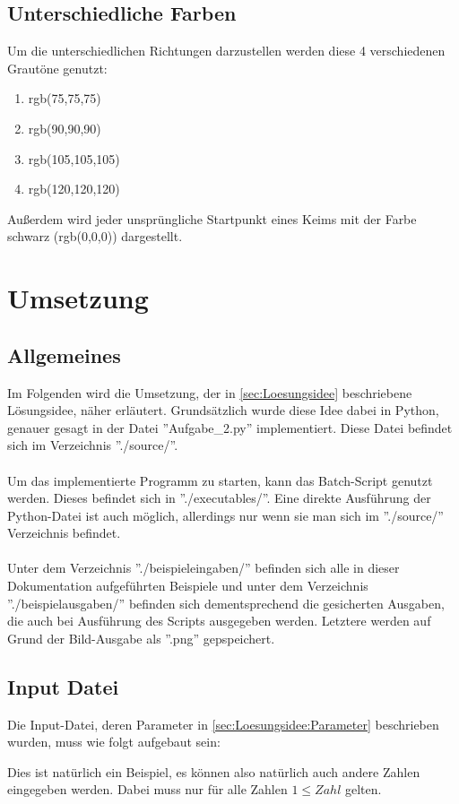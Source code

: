 \documentclass[a4paper,10pt,ngerman]{scrartcl}
\begin{document}
    \subsection{Unterschiedliche Farben}
      Um die unterschiedlichen Richtungen darzustellen werden diese 4 verschiedenen Grautöne genutzt:
      \begin{enumerate}
        \item rgb(75,75,75)
        \item rgb(90,90,90)
        \item rgb(105,105,105)
        \item rgb(120,120,120)
      \end{enumerate}
      Außerdem wird jeder unsprüngliche Startpunkt eines Keims mit der Farbe schwarz (rgb(0,0,0)) dargestellt.
  \section{Umsetzung}
    \subsection{Allgemeines}
      Im Folgenden wird die Umsetzung, der in \cref{sec:Loesungsidee} beschriebene Lösungsidee, näher erläutert. Grundsätzlich wurde diese Idee dabei in Python, genauer gesagt in der Datei ''Aufgabe\_2.py'' implementiert. Diese Datei befindet sich im Verzeichnis ''./source/''.\\\\
      Um das implementierte Programm zu starten, kann das Batch-Script genutzt werden. Dieses befindet sich in ''./executables/''. Eine direkte Ausführung der Python-Datei ist auch möglich, allerdings nur wenn sie man sich im ''./source/'' Verzeichnis befindet.\\\\
      Unter dem Verzeichnis ''./beispieleingaben/'' befinden sich alle in dieser Dokumentation aufgeführten Beispiele und unter dem Verzeichnis ''./beispielausgaben/'' befinden sich dementsprechend die gesicherten Ausgaben, die auch bei Ausführung des Scripts ausgegeben werden. Letztere werden auf Grund der Bild-Ausgabe als ''.png'' gepspeichert.
    \subsection{Input Datei\label{sec:Umsetzung:Input}}
      Die Input-Datei, deren Parameter in \cref{sec:Loesungsidee:Parameter} beschrieben wurden, muss wie folgt aufgebaut sein:
      
      Dies ist natürlich ein Beispiel, es können also natürlich auch andere Zahlen eingegeben werden. Dabei muss nur für alle Zahlen $1\leq Zahl$ gelten.
\end{document}
